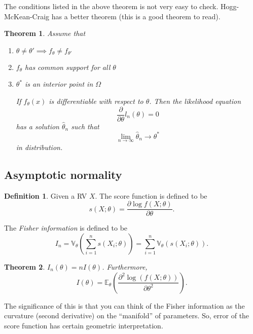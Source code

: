 \documentclass[
  openany]{book}
\newtheorem{theorem}{Theorem}[chapter]
\theoremstyle{definition}
\newtheorem{definition}{Definition}[chapter]
\theoremstyle{definition}
\theoremstyle{definition}
\theoremstyle{definition}
\theoremstyle{remark}
\begin{document}
The conditions listed in the above theorem is not very easy to check.
Hogg-McKean-Craig has a better theorem (this is a good theorem to read).

\begin{theorem}

Assume that

\begin{enumerate}
\def\labelenumi{\arabic{enumi}.}
\item
  \(\theta \not = \theta' \implies f_\theta \not = f_{\theta'}\)
\item
  \(f_\theta\) has common support for all \(\theta\)
\item
  \(\theta^*\) is an interior point in \(\Omega\)

  If \(f_\theta(x)\) is differentiable with respect to \(\theta\).
  Then the likelihood equation
  \[ \frac{\partial}{\partial \theta}  l_n(\theta) = 0 \]
  has a solution \(\hat \theta_n\) such that
  \[\lim_{n\to \infty} \hat \theta_n \to \theta^*\] in distribution.
\end{enumerate}

\end{theorem}

\hypertarget{asymptotic-normality}{%
\subsection{Asymptotic normality}\label{asymptotic-normality}}

\begin{definition}
Given a RV \(X\).
The score function is defined to be
\[ s (X;\theta) = \frac{\partial \log f(X; \theta)}{\partial \theta} .\]

The \emph{Fisher information} is defined to be
\[ I_n = \mathbb{V}_\theta \left( \sum_{i=1}^n s(X_i; \theta)  \right) = \sum_{i=1}^n \mathbb{V}_\theta \left( s(X_i; \theta)  \right).\]
\end{definition}

\begin{theorem}
\(I_n (\theta) = n I(\theta)\).
Furthermore,
\[ I(\theta) = \mathbb{E}_\theta \left( \frac{\partial^2 \log(f(X;\theta))}{\partial \theta^2} \right).\]
\end{theorem}

The significance of this is that you can think of
the Fisher information as the curvature (second derivative) on the ``manifold''
of parameters.
So, error of the score function has certain geometric interpretation.
\end{document}
